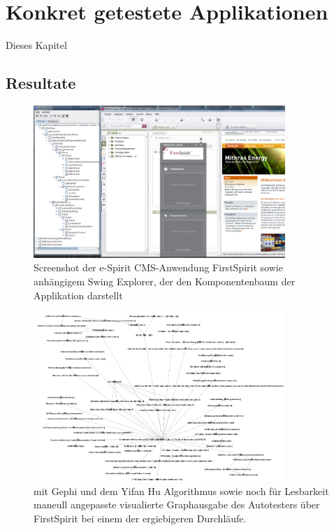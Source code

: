 \chapter{Konkret getestete Applikationen}\label{chapter:concretetests}


Dieses Kapitel


\section{Resultate}\label{section:testresults}

\begin{figure}
	\centering
	\includegraphics[width=0.85\textwidth]{bilder/screenshot_freespirit.png}
	\caption{Screenshot der e-Spirit CMS-Anwendung FirstSpirit \cite{website:firstspirit} 
	sowie anhängigem Swing Explorer, der den Komponentenbaum der Applikation darstellt}
	\label{fig:screenshot_freespirit}
\end{figure}

\begin{figure}
	\centering
	\includegraphics[width=0.85\textwidth]{bilder/model_freespirit.png}
	\caption{mit Gephi \cite{website:gephi} und dem Yifan Hu Algorithmus \cite{hu2005efficient}
    sowie noch für Lesbarkeit maneull angepasste visualierte Graphausgabe 
	des Autotesters über FirstSpirit bei einem der ergiebigeren Durchläufe.}
	\label{fig:model_freespirit_06.10.2015}
\end{figure}



